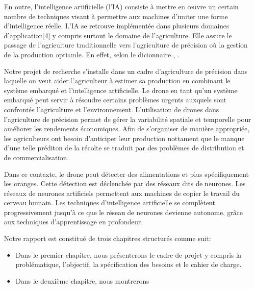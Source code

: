 En outre, l'intelligence artificielle (l'IA) consiste à mettre en œuvre un certain nombre de techniques visant à permettre aux machines d'imiter une forme d'intelligence réelle. L'IA se retrouve implémentée dans plusieurs domaines d'application[4] y compris surtout le domaine de l'agriculture. Elle assure le passage de l'agriculture traditionnelle vers l'agriculture de précision où la gestion de la production optiamle. En effet, selon le dicionnaire , .


Notre projet de recherche s'installe dans un cadre d'agriculture de précision dans laquelle on veut aider l'agriculteur à estimer sa production en combinant le système embarqué et l'intelligence artificielle. Le drone en tant qu'un système embarqué peut servir à résoudre certains problèmes urgents auxquels sont confrontés l'agriculture et l'environnement. L'utilisation de drones dans l'agriculture de précision permet de gérer la variabilité spatiale et temporelle pour améliorer les rendements économiques. Afin de s'organiser de manière appropriée, les agriculteurs ont besoin d'anticiper leur production nottament que le manque d'une telle préditon de la récolte se traduit par des problèmes de distribution et de commercialisation.


Dans ce contexte, le drone peut détecter des alimentations et plus spécifiquement les oranges. Cette détection est déclenchée par des réseaux dits de neurones. Les réseaux de neurones artificiels permettent aux machines de copier le travail du cerveau humain. Les techniques d'intelligence artificielle se complètent progressivement jusqu'à ce que le réseau de neurones devienne autonome, grâce aux techniques d'apprentissage en profondeur.


Notre rapport est constitué de trois chapitres structurés comme suit:

\begin{itemize}
	\item Dans le premier chapitre, nous présenterons le cadre de projet y compris la problématique, l'objectif, la spécification des besoins et le cahier de charge.
	\item Dans le deuxième chapitre, nous montrerons 
\end{itemize}

	
	
	
	
	
	
	
	
